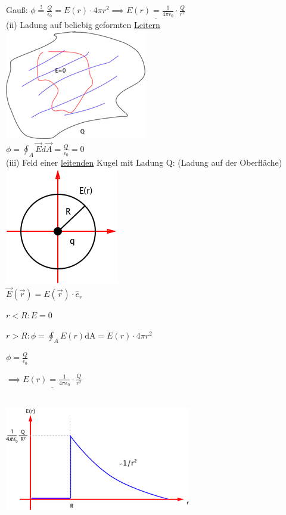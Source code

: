 \documentclass[11pt]{article}
\begin{document}
Gauß: $\phi\overset{!}{=} \frac{Q}{\epsilon_0}=E(r)\cdot4\pi r^2 \implies \underline{E(r)=\frac{1}{4\pi\epsilon_0}\cdot\frac{Q}{r^2}}$\\

(ii) Ladung auf beliebig geformten \underline{Leitern}\\

\includegraphics{skizzen/14/14_6B3}\\

$\phi=\oint_{A}\vec{E}d\vec{A}=\frac{Q}{\epsilon_0}=0$\\

(iii) Feld einer \underline{leitenden} Kugel mit Ladung Q: (Ladung auf der Oberfläche)\\

\includegraphics{skizzen/14/14_6B4}\\

$ \vec{E}(\vec{r})= E(\vec{r})\cdot\hat{e}_r $

$ r<R: E=0 $

$ r>R: \phi=\oint_{A}E(r)\mathrm{dA}=E(r)\cdot4\pi r^2 $

$ \phi=\frac{Q}{\epsilon_0} $

$ \implies \underline{E(r)= \frac{1}{4\pi\epsilon_0}\cdot\frac{Q}{r^2}} $

\hfill\\

\includegraphics{skizzen/14/14_6B5}\\
\end{document}
